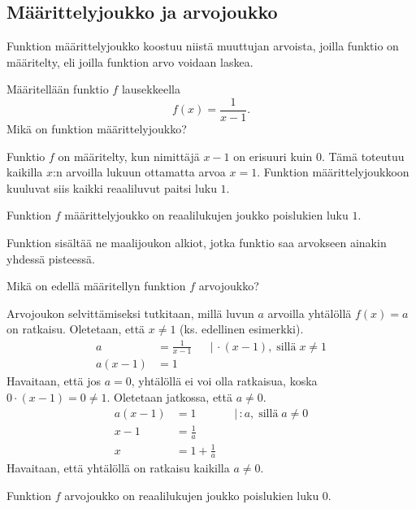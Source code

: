 \subsection*{Määrittelyjoukko ja arvojoukko}

Funktion määrittelyjoukko koostuu niistä muuttujan arvoista, joilla
funktio on määritelty, eli joilla funktion arvo voidaan laskea.

\begin{esimerkki}
	Määritellään funktio $f$ lausekkeella \[ f(x) = \frac{1}{x-1}. \]
	Mikä on funktion määrittelyjoukko?
	\begin{esimratk}
		Funktio $f$ on määritelty, kun nimittäjä $x-1$ on erisuuri kuin 0.
		Tämä toteutuu kaikilla $x$:n arvoilla lukuun ottamatta arvoa $x = 1$.
		Funktion määrittelyjoukkoon kuuluvat siis kaikki reaaliluvut paitsi luku $1$.
	\end{esimratk}
	\begin{esimvast}
		Funktion $f$ määrittelyjoukko on reaalilukujen joukko poislukien luku $1$.
	\end{esimvast}
\end{esimerkki}

Funktion  sisältää ne maalijoukon alkiot,
jotka funktio saa arvokseen ainakin yhdessä pisteessä.

\begin{esimerkki}
	Mikä on edellä määritellyn funktion $f$ arvojoukko?
	\begin{esimratk}
		Arvojoukon selvittämiseksi tutkitaan, millä luvun $a$ arvoilla
		yhtälöllä $f(x) = a$ on ratkaisu. Oletetaan, että $x \neq 1$ (ks. edellinen esimerkki).
		\begin{align*}
			a &= \frac{1}{x-1} & &| \, \cdot (x-1), \; \text{sillä} \; x \neq 1 \\
			a(x-1) &= 1
		\end{align*}
		Havaitaan, että jos $a = 0$, yhtälöllä ei voi olla ratkaisua, koska $0 \cdot (x-1) = 0 \neq 1$.
		Oletetaan jatkossa, että $a \neq 0$.
		\begin{align*}
			a(x-1) &= 1 & &| \, : a, \; \text{sillä} \; a \neq 0 \\
			x-1 &= \frac{1}{a} \\
			x &= 1+\frac{1}{a}
		\end{align*}
		Havaitaan, että yhtälöllä on ratkaisu kaikilla $a \neq 0$.
	\end{esimratk}
	\begin{esimvast}
		Funktion $f$ arvojoukko on reaalilukujen joukko poislukien luku $0$.
	\end{esimvast}
\end{esimerkki}

